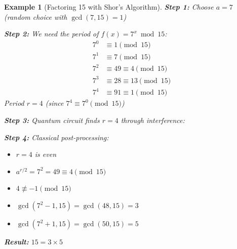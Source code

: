 \documentclass[11pt,a4paper]{article}
\newtheorem{example}{Example}
\begin{document}
\begin{example}[Factoring 15 with Shor's Algorithm]
\textbf{Step 1:} Choose $a = 7$ (random choice with $\gcd(7, 15) = 1$)

\textbf{Step 2:} We need the period of $f(x) = 7^x \bmod 15$:
\begin{align}
7^0 &\equiv 1 \pmod{15}\\
7^1 &\equiv 7 \pmod{15}\\
7^2 &\equiv 49 \equiv 4 \pmod{15}\\
7^3 &\equiv 28 \equiv 13 \pmod{15}\\
7^4 &\equiv 91 \equiv 1 \pmod{15}
\end{align}
Period $r = 4$ (since $7^4 \equiv 7^0 \pmod{15}$)

\textbf{Step 3:} Quantum circuit finds $r = 4$ through interference:
\begin{center}
\end{center}

\textbf{Step 4:} Classical post-processing:
\begin{itemize}
    \item $r = 4$ is even \checkmark
    \item $a^{r/2} = 7^2 = 49 \equiv 4 \pmod{15}$
    \item $4 \not\equiv -1 \pmod{15}$ \checkmark
    \item $\gcd(7^2 - 1, 15) = \gcd(48, 15) = 3$
    \item $\gcd(7^2 + 1, 15) = \gcd(50, 15) = 5$
\end{itemize}

\textbf{Result:} $15 = 3 \times 5$ \checkmark
\end{example}
\end{document}
